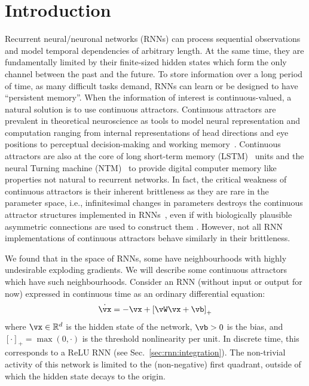 \documentclass{article}
\newcounter{ct}
\newcommand{\reals}{\mathbb{R}}
\theoremstyle{definition}
\theoremstyle{remark}
\begin{document}
\section{Introduction}

Recurrent neural/neuronal networks (RNNs) can process sequential observations and model temporal dependencies of arbitrary length.
At the same time, they are fundamentally limited by their finite-sized hidden states which form the only channel between the past and the future.
To store information over a long period of time, as many difficult tasks demand, RNNs can learn or be designed to have ``persistent memory''.
When the information of interest is continuous-valued, a natural solution is to use continuous attractors.
Continuous attractors are prevalent in theoretical neuroscience as tools to model neural representation and computation ranging from internal representations of head directions and eye positions to perceptual decision-making and working memory~\cite{Khona2022}.
Continuous attractors are also at the core of long short-term memory (LSTM)~\cite{Greff2017} units and the neural Turning machine (NTM)~\cite{Graves2014} to provide digital computer memory like properties not natural to recurrent networks. %
In fact, the critical weakness of continuous attractors is their inherent brittleness as they are rare in the parameter space, i.e., infinitesimal changes in parameters destroys the continuous attractor structures implemented in RNNs~\cite{seung1996,Renart2003}, even if with biologically plausible asymmetric connections are used to construct them \citep{darshan2022}.
However, not all RNN implementations of continuous attractors behave similarly in their brittleness.

We found that in the space of RNNs, some have neighbourhoods with highly undesirable exploding gradients. We will describe some continuous attractors which have such neighbourhoods.
Consider an RNN (without input or output for now) expressed in continuous time as an ordinary differential equation:
\begin{align}\label{eq:TLN}
    \dot{\vx} = -\vx + \left[ \vW \vx + \vb \right]_{+}
\end{align}
where $\vx \in \reals^d$ is the hidden state of the network, $\vb > 0$ is the bias, and $[\cdot]_{+} = \max(0,\cdot)$ is the threshold nonlinearity per unit.
In discrete time, this corresponds to a ReLU RNN (see Sec.~\ref{sec:rnn:integration}).
The non-trivial activity of this network is limited to the (non-negative) first quadrant, outside of which the hidden state decays to the origin.
\end{document}
